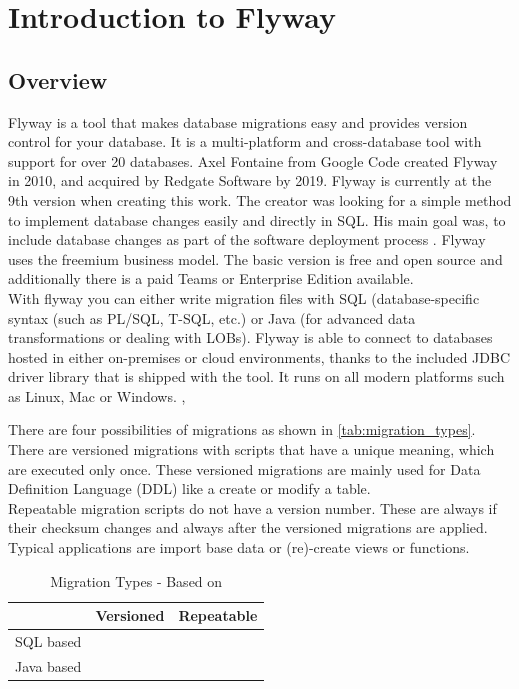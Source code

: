 

\chapter{Introduction to Flyway}


\section{Overview}
%
Flyway is a tool that makes database migrations easy and provides version control for your database. It is a multi-platform and cross-database tool with support for over 20 databases.
Axel Fontaine from Google Code created Flyway in 2010, and acquired by Redgate Software by 2019. Flyway is currently at the 9th version when creating this work. The creator was looking for a simple method to implement database changes easily and directly in SQL. His main goal was, to include database changes as part of the software deployment process \cite{Robles2021}.
Flyway uses the freemium business model.  The basic version is free and open source \cite{Fontaine2010} and additionally there is a paid Teams or Enterprise Edition available.\\
With flyway you can either write migration files with SQL (database-specific syntax (such as PL/SQL, T-SQL, etc.) or Java (for advanced data transformations or dealing with LOBs). Flyway is able to connect to databases hosted in either on-premises or cloud environments, thanks to the included JDBC driver library that is shipped with the tool. It runs on all modern platforms such as Linux, Mac or Windows.  \cite{Dillon2022}, \cite{DBMSTools}


%
There are four possibilities of migrations as shown in \autoref{tab:migration_types}. There are versioned migrations with scripts that have a unique meaning, which are executed only once. These versioned migrations are mainly used for Data Definition Language (DDL) like a create or modify a table. \\

Repeatable migration scripts do not have a version number. These are always if their checksum changes and always after the versioned migrations are applied. Typical applications are import base data or (re)-create views or functions.

\begin{table}[h]
	\centering
	\begin{tabularx}{8cm}{X|c c}
		& Versioned & Repeatable \\ \hline
		SQL based & \checkmark & \checkmark \\
		Java based & \checkmark & \checkmark \\
	\end{tabularx}
	\caption{Migration Types - Based on \cite{Parsick2018}}
	\label{tab:migration_types}
\end{table}

